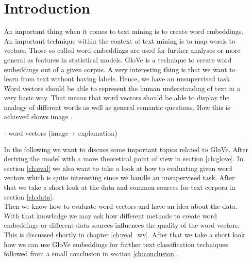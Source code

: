 \chapter{Introduction}

An important thing when it comes to text mining is to create word embeddings. 
An important technique within the context of text mining is to map words to vectors. Those so 
called word embeddings are used for further analyses or more general as features in statistical
models. GloVe is a technique to create word embeddings out of a given corpus. A very interesting 
thing is that we want to learn from text without having labels. Hence, we have an unsupervised 
task. \\

Word vectors should be able to represent the human understanding of text in a very 
basic way. That means that word vectors should be able to display the analogy of different 
words as well as general semantic questions. How this is achieved shows image \label{fig:wv}. 


- word vectors (image + explamation)

In the following we want to discuss some important topics related to GloVe. After 
deriving the model with a more theoretical point of view in section \ref{ch:glove}. 
In section \ref{ch:eval} we also want to take a look at how to evaluating given word 
vectors which is quite interesting since we handle an unsupervised task. After that we 
take a short look at the data and common sources for text corpora in section \ref{ch:data}. \\

Then we know how to evaluate word vectors and have an idea about the data. With that 
knowledge we may ask how different methods to create word embeddings or different data 
sources influences the quality of the word vectors. This is discussed shortly in chapter
\ref{ch:real_wv}. After that we take a short look how we can use GloVe embeddings for
further text classification techniques followed from a small conclusion in section
\ref{ch:conclusion}.
